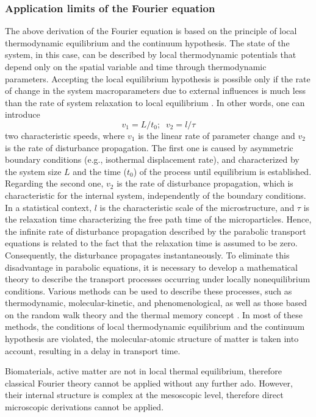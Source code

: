 \documentclass[sn-mathphys]{sn-jnl}%
\theoremstyle{thmstyleone}%
\theoremstyle{thmstyletwo}%
\theoremstyle{thmstylethree}%
\begin{document}
{\subsubsection{Application limits of the Fourier equation}
The above derivation of the Fourier equation is based on the principle of local thermodynamic equilibrium and the continuum hypothesis. The state of the system, in this case, can be described by local thermodynamic potentials that depend only on the spatial variable and time through thermodynamic parameters. Accepting the local equilibrium hypothesis is possible only if the rate of change in the system macroparameters due to external influences is much less than the rate of system relaxation to local equilibrium \cite{Sobolev1991,Sobolev1997}. {In other words, one can introduce
\begin{equation}
	\nonumber
	v_1=L/t_0; \; \; v_2=l/\tau
\end{equation} 
two characteristic speeds, where $v_1$ is the linear rate of parameter change and $v_2$ is the rate of disturbance propagation. The first one is caused by asymmetric boundary conditions (e.g., isothermal displacement rate), and characterized by the system size $L$ and the time ($t_0$) of the process until equilibrium is established.
Regarding the second one, $v_2$ is the rate of disturbance propagation, which is characteristic for the internal system, independently of the boundary conditions. In a statistical context, $l$ is the characteristic scale of the microstructure, and $\tau$ is the relaxation time characterizing the free path time of the microparticles.
Hence, the infinite rate of disturbance propagation described by the parabolic transport equations is related to the fact that the relaxation time is assumed to be zero. Consequently, the disturbance propagates instantaneously.} To eliminate this disadvantage in parabolic equations, it is necessary to develop a mathematical theory to describe the transport processes occurring under locally nonequilibrium conditions. Various methods can be used to describe these processes, such as thermodynamic, molecular-kinetic, and phenomenological, as well as those based on the random walk theory and the thermal memory concept \cite{Sobolev1991,Sobolev1997,Kudinov2014, Kudinov2020}. In most of these methods, the conditions of local thermodynamic equilibrium and the continuum hypothesis are violated, the molecular-atomic structure of matter is taken into account, resulting in a delay in transport time.

Biomaterials, active matter are not in local thermal equilibrium, therefore classical Fourier theory cannot be applied without any further ado. However, their internal structure is complex at the mesoscopic level, therefore direct microscopic derivations cannot be applied.
}
\end{document}
